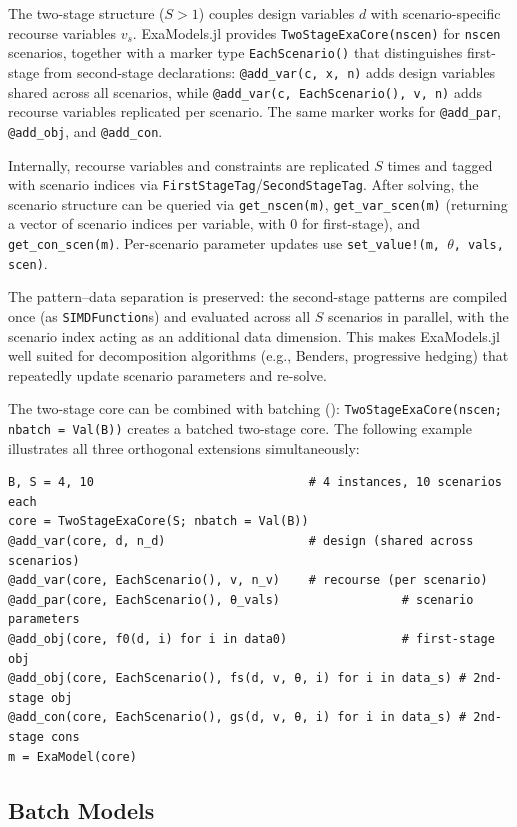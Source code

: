 \documentclass[11pt]{article}
\begin{document}
The two-stage structure ($S > 1$) couples design variables $d$ with scenario-specific recourse variables $v_s$. ExaModels.jl provides \texttt{TwoStageExaCore(nscen)} for \texttt{nscen} scenarios, together with a marker type \texttt{EachScenario()} that distinguishes first-stage from second-stage declarations: \texttt{@add\_var(c, x, n)} adds design variables shared across all scenarios, while \texttt{@add\_var(c, EachScenario(), v, n)} adds recourse variables replicated per scenario. The same marker works for \texttt{@add\_par}, \texttt{@add\_obj}, and \texttt{@add\_con}.

Internally, recourse variables and constraints are replicated $S$ times and tagged with scenario indices via \texttt{FirstStageTag}/\texttt{SecondStageTag}. After solving, the scenario structure can be queried via \texttt{get\_nscen(m)}, \texttt{get\_var\_scen(m)} (returning a vector of scenario indices per variable, with 0 for first-stage), and \texttt{get\_con\_scen(m)}. Per-scenario parameter updates use \texttt{set\_value!(m, $\theta$, vals, scen)}.

The pattern--data separation is preserved: the second-stage patterns are compiled once (as \texttt{SIMDFunction}s) and evaluated across all $S$ scenarios in parallel, with the scenario index acting as an additional data dimension. This makes ExaModels.jl well suited for decomposition algorithms (e.g., Benders, progressive hedging) that repeatedly update scenario parameters and re-solve.

The two-stage core can be combined with batching (): \texttt{TwoStageExaCore(nscen; nbatch = Val(B))} creates a batched two-stage core. The following example illustrates all three orthogonal extensions simultaneously:
\begin{lstlisting}
B, S = 4, 10                              # 4 instances, 10 scenarios each
core = TwoStageExaCore(S; nbatch = Val(B))
@add_var(core, d, n_d)                    # design (shared across scenarios)
@add_var(core, EachScenario(), v, n_v)    # recourse (per scenario)
@add_par(core, EachScenario(), θ_vals)                 # scenario parameters
@add_obj(core, f0(d, i) for i in data0)                # first-stage obj
@add_obj(core, EachScenario(), fs(d, v, θ, i) for i in data_s) # 2nd-stage obj
@add_con(core, EachScenario(), gs(d, v, θ, i) for i in data_s) # 2nd-stage cons
m = ExaModel(core)
\end{lstlisting}

\subsection{Batch Models}
\label{sec:extensions:batch}
\end{document}
